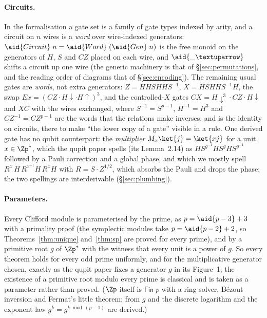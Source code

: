 \paragraph{Circuits.}  In the formalisation a gate set is a family of gate types indexed by
arity, and a circuit on $n$ wires is a \emph{word} over wire-indexed
generators: $\aid{Circuit}\;n = \aid{Word}\;(\aid{Gen}\;n)$ is the free
monoid on the generators of $H$, $S$ and $CZ$ placed on each wire, and
$\aid{{\_}↑}$ shifts a circuit up one wire (the generic machinery is
that of \S\ref{sec:permutations}, and the reading order of diagrams
that of \S\ref{sec:encoding}).  The remaining usual gates are \emph{words}, not extra
generators: $Z = H H S H H S^{-1}$, $X = H S H H S^{-1} H$, the swap
$\mathit{Ex} = (CZ \cdot H{\downarrow} \cdot H{\uparrow})^{3}$, and the
controlled-$X$ gates $CX = H{\downarrow}^{3} \cdot CZ \cdot
H{\downarrow}$ and $XC$ with the wires exchanged, where $S^{-1} =
S^{p-1}$, $H^{-1} = H^{3}$ and $CZ^{-1} = CZ^{p-1}$ are the words that
the relations make inverses, and  is the identity on
circuits, there to make ``the lower copy of a gate'' visible in a rule.
One derived gate has no qubit counterpart: the \emph{multiplier}
$M_x\ket{j} = \ket{xj}$ for a unit $x \in \Zp^{*}$, which the qupit
paper spells (its Lemma~2.14) as $H S^{g^{-1}} H S^{g} H S^{g^{-1}}$
followed by a Pauli correction and a global phase, and which we mostly
spell $R^{x}\,H\,R^{x^{-1}}H\,R^{x}H$ with $R = S\cdot Z^{1/2}$, which
absorbs the Pauli and drops the phase; the two spellings are
interderivable (\S\ref{sec:plumbing}).

\paragraph{Parameters.}  Every Clifford module is
parameterised by the prime, as $p = \aid{p-3} + 3$ with a primality
proof (the symplectic modules take $p = \aid{p-2} + 2$, so
Theorems~\ref{thm:unique} and~\ref{thm:sp} are proved for every prime),
and by a primitive root $g$ of $\Zp^{*}$ with the witness 
that every unit is a power of $g$.  So every theorem holds for every odd
prime uniformly, and for the multiplicative generator chosen, exactly as
the qupit paper fixes a generator $g$ in its Figure~1; the existence of
a primitive root modulo every prime is classical and is taken as a
parameter rather than proved.  ($\Zp$ itself is $\mathsf{Fin}\;p$ with
a ring solver, B\'ezout inversion and Fermat's little theorem; from $g$
and  the discrete logarithm and the exponent law $g^{k} =
g^{k \bmod (p-1)}$ are derived.)


